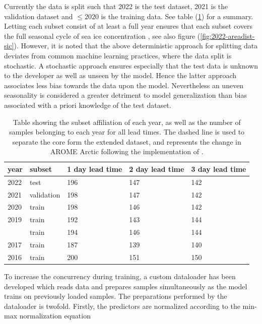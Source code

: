 \documentclass[../main/thesis]{subfiles}
\begin{document}
Currently the data is split such that 2022 is the test dataset, 2021 is the validation dataset and $\leq2020$ is the training data. See table (\ref{tab:data_subset_sizes}) for a summary. Letting each subset consist of at least a full year ensures that each subset covers the full seasonal cycle of sea ice concentration \citep{Cavalieri2012}, see also figure (\ref{fig:2022-areadist-sic}). However, it is noted that the above deterministic approach for splitting data deviates from common machine learning practices, where the data split is stochastic. A stochastic approach ensures especially that the test data is unknown to the developer as well as unseen by the model. Hence the latter approach associates less bias towards the data upon the model. Nevertheless an uneven seasonality is considered a greater detriment to model generalization than bias associated with a priori knowledge of the test dataset.

\begin{table}[]
    \caption{\label{tab:data_subset_sizes}Table showing the subset affiliation of each year, as well as the number of samples belonging to each year for all lead times. The dashed line is used to separate the core form the extended dataset, and represents the change in AROME Arctic following the implementation of \protect\citep{Batrak2019}.}
    \centering
    \setlength{\arrayrulewidth}{0.5mm}
    \renewcommand{\arraystretch}{1.3}
    \begin{tabular}{lllll}
    \hline
    year   & subset & 1 day lead time & 2 day lead time & 3 day lead time \\
    \hline
    2022 & test       & 196 & 147 & 142 \\
    2021 & validation & 198 & 147 & 142 \\
    2020 & train      & 198 & 146 & 142 \\
    2019 & train      & 192 & 143 & 144 \\
    \hdashline
    2018 & train      & 194 & 146 & 144 \\
    2017 & train      & 187 & 139 & 140 \\
    2016 & train      & 200 & 151 & 150 \\
    \hline         
    \end{tabular}
\end{table}

To increase the concurrency during training, a custom dataloader has been developed which reads data and prepares samples simultaneously as the model trains on previously loaded samples. The preparations performed by the dataloader is twofold. Firstly, the predictors are normalized according to the min-max normalization equation 
\end{document}
